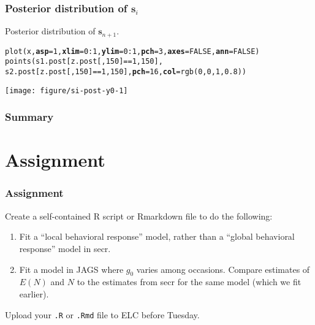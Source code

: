 \documentclass[color=usenames,dvipsnames]{beamer}\usepackage[]{graphicx}\usepackage[]{color}
\makeatletter
\newcommand{\hlnum}[1]{\textcolor[rgb]{0.69,0.494,0}{#1}}%
\newcommand{\hlopt}[1]{\textcolor[rgb]{0,0,0}{#1}}%
\newcommand{\hlstd}[1]{\textcolor[rgb]{0,0,0}{#1}}%
\newcommand{\hlkwc}[1]{\textcolor[rgb]{0,0,0}{\textbf{#1}}}%
\newcommand{\hlkwd}[1]{\textcolor[rgb]{0.004,0.004,0.506}{#1}}%
\newenvironment{kframe}{%
 \def\at@end@of@kframe{}%
 \ifinner\ifhmode%
  \def\at@end@of@kframe{\end{minipage}}%
  \begin{minipage}{\columnwidth}%
 \fi\fi%
 \def\FrameCommand##1{\hskip\@totalleftmargin \hskip-\fboxsep
 \colorbox{shadecolor}{##1}\hskip-\fboxsep
     \hskip-\linewidth \hskip-\@totalleftmargin \hskip\columnwidth}%
 \MakeFramed {\advance\hsize-\width
   \@totalleftmargin\z@ \linewidth\hsize
   \@setminipage}}%
 {\par\unskip\endMakeFramed%
 \at@end@of@kframe}
\newenvironment{knitrout}{}{} %
\newcommand{\bs}{{\bm s}}
\newcommand{\bsi}{{\bm s}_i}
\makeatother
\begin{document}
\begin{frame}[fragile]
  \frametitle{Posterior distribution of $\bsi$}
  \small
  Posterior distribution of $\bs_{n+1}$. 
\begin{knitrout}\scriptsize
{}\color{fgcolor}\begin{kframe}
\begin{alltt}
\hlkwd{plot}\hlstd{(x,} \hlkwc{asp}\hlstd{=}\hlnum{1}\hlstd{,} \hlkwc{xlim}\hlstd{=}\hlnum{0}\hlopt{:}\hlnum{1}\hlstd{,} \hlkwc{ylim}\hlstd{=}\hlnum{0}\hlopt{:}\hlnum{1}\hlstd{,} \hlkwc{pch}\hlstd{=}\hlnum{3}\hlstd{,} \hlkwc{axes}\hlstd{=}\hlnum{FALSE}\hlstd{,} \hlkwc{ann}\hlstd{=}\hlnum{FALSE}\hlstd{)}
\hlkwd{points}\hlstd{(s1.post[z.post[,}\hlnum{150}\hlstd{]}\hlopt{==}\hlnum{1}\hlstd{,}\hlnum{150}\hlstd{],}
       \hlstd{s2.post[z.post[,}\hlnum{150}\hlstd{]}\hlopt{==}\hlnum{1}\hlstd{,}\hlnum{150}\hlstd{],} \hlkwc{pch}\hlstd{=}\hlnum{16}\hlstd{,} \hlkwc{col}\hlstd{=}\hlkwd{rgb}\hlstd{(}\hlnum{0}\hlstd{,}\hlnum{0}\hlstd{,}\hlnum{1}\hlstd{,}\hlnum{0.8}\hlstd{))}
\end{alltt}
\end{kframe}
\end{knitrout}
\centering
\texttt{[image: figure/si-post-y0-1]} \\
\end{frame}





\begin{frame}
  \frametitle{Summary}
\end{frame}




\section{Assignment}




\begin{frame}[fragile]
  \frametitle{Assignment}
  Create a self-contained R script or Rmarkdown file to do the
  following: 
  \vfill
  \begin{enumerate}
    \item Fit a ``local behavioral response'' model,
      rather than a ``global behavioral response'' model in secr.
    \item Fit a model in JAGS where $g_0$ varies among
      occasions. Compare estimates of $E(N)$ and $N$ to the estimates
      from secr for the same model (which we fit earlier).
  \end{enumerate}
  \vfill
  Upload your {\tt .R} or {\tt .Rmd} file to ELC before Tuesday. 
\end{frame}
\end{document}
